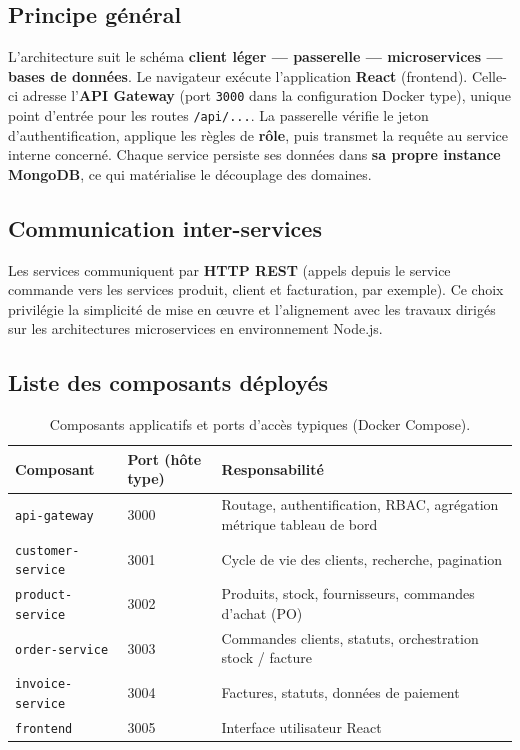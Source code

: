 \documentclass[11pt,a4paper]{article}
\begin{document}
\subsection{Principe général}
L'architecture suit le schéma \textbf{client léger — passerelle — microservices — bases de données}. Le navigateur exécute l'application \textbf{React} (frontend). Celle-ci adresse l'\textbf{API Gateway} (port \texttt{3000} dans la configuration Docker type), unique point d'entrée pour les routes \texttt{/api/...}. La passerelle vérifie le jeton d'authentification, applique les règles de \textbf{rôle}, puis transmet la requête au service interne concerné. Chaque service persiste ses données dans \textbf{sa propre instance MongoDB}, ce qui matérialise le découplage des domaines.

\subsection{Communication inter-services}
Les services communiquent par \textbf{HTTP REST} (appels depuis le service commande vers les services produit, client et facturation, par exemple). Ce choix privilégie la simplicité de mise en œuvre et l'alignement avec les travaux dirigés sur les architectures microservices en environnement Node.js.

\subsection{Liste des composants déployés}
\begin{table}[htbp]
\centering
\begin{tabular}{@{}llp{6.6cm}@{}}
\toprule
\textbf{Composant} & \textbf{Port (hôte type)} & \textbf{Responsabilité} \\
\midrule
\texttt{api-gateway} & 3000 & Routage, authentification, RBAC, agrégation métrique tableau de bord \\
\texttt{customer-service} & 3001 & Cycle de vie des clients, recherche, pagination \\
\texttt{product-service} & 3002 & Produits, stock, fournisseurs, commandes d'achat (PO) \\
\texttt{order-service} & 3003 & Commandes clients, statuts, orchestration stock / facture \\
\texttt{invoice-service} & 3004 & Factures, statuts, données de paiement \\
\texttt{frontend} & 3005 & Interface utilisateur React \\
\bottomrule
\end{tabular}
\caption{Composants applicatifs et ports d'accès typiques (Docker Compose).}
\end{table}
\end{document}
